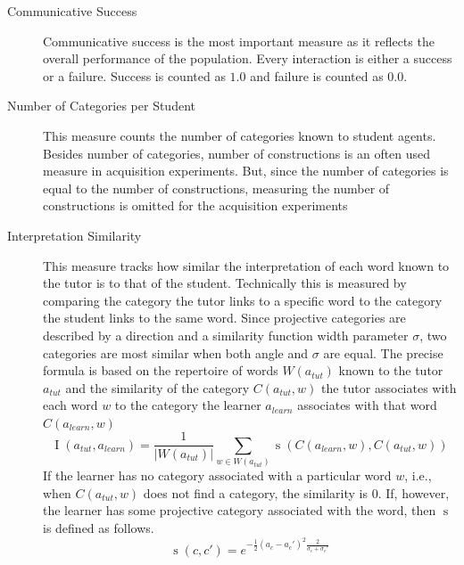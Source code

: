 \begin{description}
\item[Communicative Success] Communicative success is the most important
measure as it reflects the overall performance of the population. Every interaction
is either a success or a failure. Success is counted as $1.0$ and failure 
is counted as $0.0$. 
\item[Number of Categories per Student] This measure counts 
the number of categories known to student agents. 
Besides number of categories, number of constructions is an often
used measure in acquisition experiments.
But, since the number of categories is equal to the number of constructions, 
measuring the number of constructions is omitted for the acquisition experiments
\item[Interpretation Similarity] This measure tracks how similar the 
interpretation of each word known to the tutor is to that of the student. 
Technically this is measured by comparing the category the tutor links
to a specific word to the category the student links to the same word.
Since projective categories are described by a direction and a similarity function 
width parameter $\sigma$, two categories are most similar when both angle 
and $\sigma$ are equal. The precise formula is based on the repertoire of 
words $W(a_{tut})$ known to the tutor 
$a_{tut}$ and the similarity of the category $C(a_{tut},w)$ the tutor 
associates with each word $w$ to the category the learner $a_{learn}$
associates with that word $C(a_{learn},w)$
\begin{equation*}
\operatorname{I} (a_{tut},a_{learn}) 
= 
\frac{1}{|W(a_{tut})|}\sum_{w \in W(a_{tut})} 
\operatorname{s} \left(C(a_{learn},w),C(a_{tut},w)\right)
\end{equation*}
If the learner has no category associated with a particular word $w$, i.e., when $C(a_{tut},w)$ 
does not find a category, the similarity is $0$. If, however, the learner has some projective category
associated with the word, then $\operatorname{s}$ is defined as follows.
\begin{equation*}
\operatorname{s}(c,c')=e^{-\frac{1}{2}(a_c - a_c')^2\frac{2}{\sigma_c + \sigma_c'}}
\end{equation*}
\end{description}

